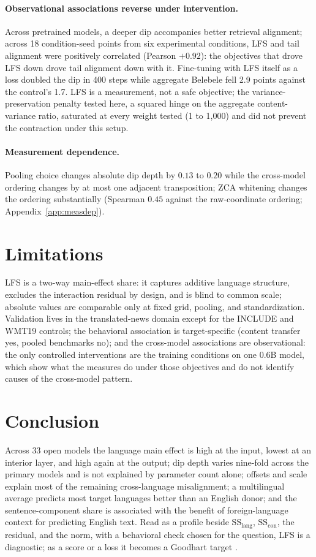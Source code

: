 \documentclass{article} %
\newcommand{\SSl}{\mathrm{SS}_{\mathrm{lang}}}
\newcommand{\SSc}{\mathrm{SS}_{\mathrm{con}}}
\begin{document}
\paragraph{Observational associations reverse under intervention.} Across pretrained models, a deeper dip accompanies better retrieval alignment; across 18 condition-seed points from six experimental conditions, LFS and tail alignment were positively correlated (Pearson $+0.92$): the objectives that drove LFS down drove tail alignment down with it. Fine-tuning with LFS itself as a loss doubled the dip in 400 steps while aggregate Belebele fell 2.9 points against the control's 1.7. LFS is a measurement, not a safe objective; the variance-preservation penalty tested here, a squared hinge on the aggregate content-variance ratio, saturated at every weight tested (1 to 1{,}000) and did not prevent the contraction under this setup.


\paragraph{Measurement dependence.} Pooling choice changes absolute dip depth by $0.13$ to $0.20$ while the cross-model ordering changes by at most one adjacent transposition; ZCA whitening changes the ordering substantially (Spearman $0.45$ against the raw-coordinate ordering; Appendix~\ref{app:measdep}).

\section{Limitations}
\label{sec:limitations}

LFS is a two-way main-effect share: it captures additive language structure, excludes the interaction residual by design, and is blind to common scale; absolute values are comparable only at fixed grid, pooling, and standardization. Validation lives in the translated-news domain except for the INCLUDE and WMT19 controls; the behavioral association is target-specific (content transfer yes, pooled benchmarks no); and the cross-model associations are observational: the only controlled interventions are the training conditions on one 0.6B model, which show what the measures do under those objectives and do not identify causes of the cross-model pattern.

\section{Conclusion}
\label{sec:conclusion}
Across 33 open models the language main effect is high at the input, lowest at an interior layer, and high again at the output; dip depth varies nine-fold across the primary models and is not explained by parameter count alone; offsets and scale explain most of the remaining cross-language misalignment; a multilingual average predicts most target languages better than an English donor; and the sentence-component share is associated with the benefit of foreign-language context for predicting English text. Read as a profile beside $\SSl$, $\SSc$, the residual, and the norm, with a behavioral check chosen for the question, LFS is a diagnostic; as a score or a loss it becomes a Goodhart target \citep{gao2023scaling}.
\end{document}
